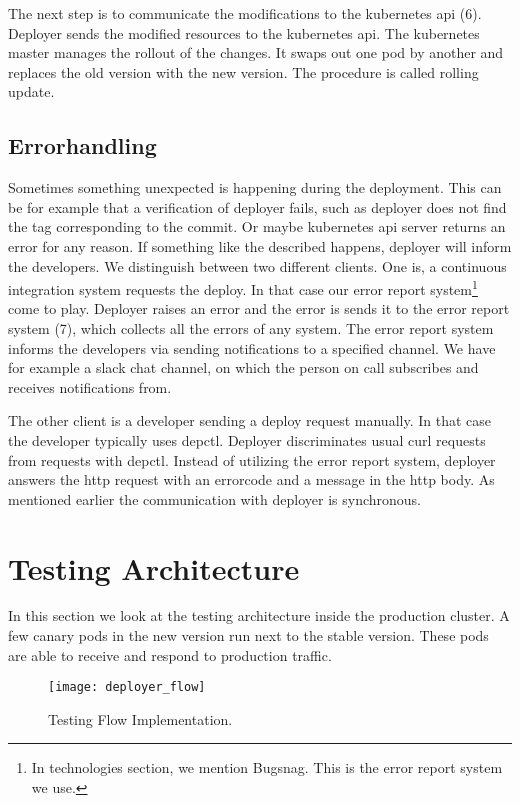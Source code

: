 The next step is to communicate the modifications to the kubernetes api (6). Deployer
sends the modified resources to the kubernetes api. The kubernetes master manages the
rollout of the changes. It swaps out one pod by another and replaces the old version with
the new version. The procedure is called rolling update.

\subsection{Errorhandling}

Sometimes something unexpected is happening during the deployment. This can be for example
that a verification of deployer fails, such as deployer does not find the tag
corresponding to the commit. Or maybe kubernetes api server returns an error for any
reason. If something like the described happens, deployer will inform the developers. We
distinguish between two different clients. One is, a continuous integration system
requests the deploy. In that case our error report system\footnote{In technologies
  section, we mention Bugsnag. This is the error report system we use.} come to
play. Deployer raises an error and the error is sends it to the error report system (7),
which collects all the errors of any system. The error report system informs the
developers via sending notifications to a specified channel. We have for example a slack
chat channel, on which the person on call subscribes and receives notifications from.

The other client is a developer sending a deploy request manually. In that case the
developer typically uses depctl. Deployer discriminates usual curl requests from requests
with depctl. Instead of utilizing the error report system, deployer answers the http
request with an errorcode and a message in the http body. As mentioned earlier the
communication with deployer is synchronous.

\section{Testing Architecture}

In this section we look at the testing architecture inside the production cluster. A few
canary pods in the new version run next to the stable version. These pods are able to
receive and respond to production traffic.

\begin{figure}[htbp] \centering \texttt{[image: deployer\_flow]}
  \caption[nprtflow]{Testing Flow Implementation.}
  \label{fig:testing_flow}
\end{figure}


